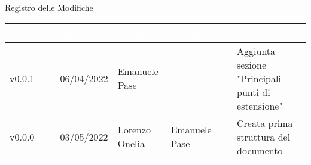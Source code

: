 \begin{center}
  \huge{Registro delle Modifiche}
\end{center}
\renewcommand\arraystretch{1,5}
{\centering
\begin{longtable}{|C{1.8cm}|C{2.1cm}|C{2cm}|C{2.4cm}|L{4.4cm}|}
  \hline
  \textcolor[HTML]{FFFFFF}{\textbf{Versione}} & \textcolor[HTML]{FFFFFF}{\textbf{Data}} & \textcolor[HTML]{FFFFFF}{\textbf{Autore}}  & \textcolor[HTML]{FFFFFF}{\textbf{Verificatore}} & \textcolor[HTML]{FFFFFF}{\textbf{Modifica}}    \\ \hline
  v0.0.1        & 06/04/2022    & Emanuele Pase   &    & Aggiunta sezione "Principali punti di estensione" \\ \hline
  v0.0.0        & 03/05/2022    & Lorenzo Onelia   & Emanuele Pase         & Creata prima struttura del documento \\ \hline
\end{longtable}}

\renewcommand\arraystretch{1}
